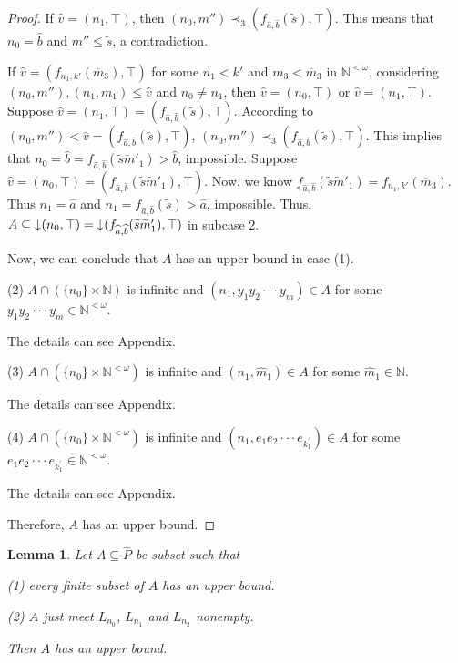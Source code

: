 \documentclass[preprint,12pt]{elsarticle}
\numberwithin{equation}{section}
\newtheorem{lemma}[theorem]{Lemma}
\newcommand{\dn}{\mathord{\downarrow}\hspace{0.05em}}
\begin{document}
\begin{proof}
If $\widehat{v}=(n_{1},\top)$, then $(n_{0},m'')\prec_{3}(f_{\widehat{a},\widehat{b}}(\widetilde{s}),\top)$. This means that $n_{0}=\widehat{b}$ and $m''\leq \widetilde{s}$, a contradiction.

If $\widehat{v}=(f_{n_{1},k'}(\overline{m}_{3}),\top)$ for some $n_{1}< k'$ and $m_{3}<\overline{m}_{3}$ in $\mathbb{N}^{<\omega}$, considering $(n_{0},m''),(n_{1},m_{1})\leq \widehat{v}$ and $n_{0}\neq n_{1}$, then $\widehat{v}=(n_{0},\top)$ or $\widehat{v}=(n_{1},\top)$. Suppose $\widehat{v}=(n_{1},\top)=(f_{\widehat{a},\widehat{b}}(\widetilde{s}),\top)$. According to $(n_{0},m'')<\widehat{v}=(f_{\widehat{a},\widehat{b}}(\widetilde{s}),\top)$, $(n_{0},m'')\prec_{3}(f_{\widehat{a},\widehat{b}}(\widetilde{s}),\top)$. This implies that $n_{0}=\widehat{b}=f_{\widehat{a},\widehat{b}}(\widetilde{s}\widetilde{m}'_{1})>\widehat{b}$, impossible. Suppose $\widehat{v}=(n_{0},\top)=(f_{\widehat{a},\widehat{b}}(\widetilde{s}\widetilde{m}'_{1}),\top)$. Now, we know $f_{\widehat{a},\widehat{b}}(\widetilde{s}\widetilde{m}'_{1})=f_{n_{1},k'}(\overline{m}_{3})$. Thus $n_{1}=\widehat{a}$ and $n_{1}=f_{\widehat{a},\widehat{b}}(\widetilde{s})>\widehat{a}$, impossible.
Thus, $A\subseteq \dn(n_{0},\top)=\dn (f_{\widehat{a},\widehat{b}}(\widetilde{s}\widetilde{m}'_{1}),\top)$ in subcase 2.

Now, we can conclude that $A$ has an upper bound in case (1).




(2) $A\cap (\{n_{0}\}\times \mathbb{N})$ is infinite and $(n_{1},y_{1}y_{2}\cdot\cdot\cdot y_{m})\in A$ for some $y_{1}y_{2}\cdot\cdot\cdot y_{m}\in\mathbb{N}^{<\omega}$.

The details can see Appendix.


(3) $A\cap (\{n_{0}\}\times \mathbb{N}^{<\omega})$ is infinite and $(n_{1},\hat{m}_{1})\in A$ for some $\hat{m}_{1}\in\mathbb{N}$.


The details can see Appendix.

(4) $A\cap (\{n_{0}\}\times \mathbb{N}^{<\omega})$ is infinite and $(n_{1},e_{1}e_{2}\cdot\cdot\cdot e_{k_{1}^{\prime}})\in A$ for some $e_{1}e_{2}\cdot\cdot\cdot e_{k_{1}^{\prime}}\in\mathbb{N}^{<\omega}$.

The details can see Appendix.

Therefore, $A$ has an upper bound.\end{proof}


\begin{lemma} {\rm Let $A\subseteq\widehat{P}$ be subset such that

(1) every finite subset of $A$ has an upper bound.

(2) $A$ just meet $L_{n_{0}}$, $L_{n_{1}}$ and  $L_{n_{2}}$ nonempty.

Then $A$ has an upper bound.}

\end{lemma}
\end{document}
